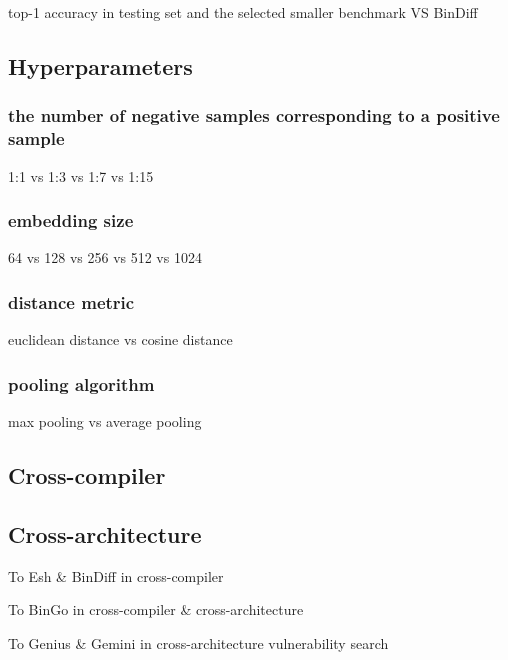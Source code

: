    

top-1 accuracy in testing set and the selected smaller benchmark VS BinDiff

\subsection{Hyperparameters}
\subsubsection{the number of negative samples corresponding to a positive sample}

1:1 vs 1:3 vs 1:7 vs 1:15

\subsubsection{embedding size}

64 vs 128 vs 256 vs 512 vs 1024

\subsubsection{distance metric}

euclidean distance vs cosine distance

\subsubsection{pooling algorithm}
max pooling vs average pooling

\subsection{Cross-compiler}


\subsection{Cross-architecture}


\par To Esh \& BinDiff in cross-compiler

\par To BinGo in cross-compiler \& cross-architecture

\par To Genius \& Gemini in cross-architecture vulnerability search


